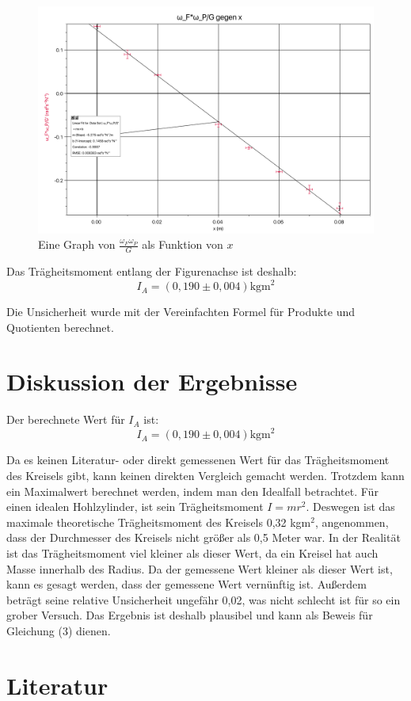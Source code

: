\documentclass[11pt,a4paper]{article} %
\begin{document}
\begin{figure}
	\centering
	\includegraphics[width=\linewidth]{Abb1}
	\caption{Eine Graph von $\frac{\omega_F\omega_P}{G}$ als Funktion von $x$}
\end{figure}
Das Trägheitsmoment entlang der Figurenachse ist deshalb:
$$I_A = (0,190 \pm 0,004) \textrm{kgm}^2$$

Die Unsicherheit wurde mit der Vereinfachten Formel für Produkte und Quotienten berechnet. 
\section{Diskussion der Ergebnisse}
Der berechnete Wert für $I_A$ ist:
$$I_A = (0,190 \pm 0,004) \textrm{kgm}^2$$

Da es keinen Literatur- oder direkt gemessenen Wert für das Trägheitsmoment des Kreisels gibt, kann keinen direkten Vergleich gemacht werden. Trotzdem kann ein Maximalwert berechnet werden, indem man den Idealfall betrachtet. Für einen idealen Hohlzylinder, ist sein Trägheitsmoment $I = mr^2$. Deswegen ist das maximale theoretische Trägheitsmoment des Kreisels 0,32 kgm$^2$, angenommen, dass der Durchmesser des Kreisels nicht größer als 0,5 Meter war. In der Realität ist das Trägheitsmoment viel kleiner als dieser Wert, da ein Kreisel hat auch Masse innerhalb des Radius. Da der gemessene Wert kleiner als dieser Wert ist, kann es gesagt werden, dass der gemessene Wert vernünftig ist. Außerdem beträgt seine relative Unsicherheit ungefähr 0,02, was nicht schlecht ist für so ein grober Versuch. Das Ergebnis ist deshalb plausibel und kann als Beweis für Gleichung (3) dienen. 
\section{Literatur}
\end{document}
